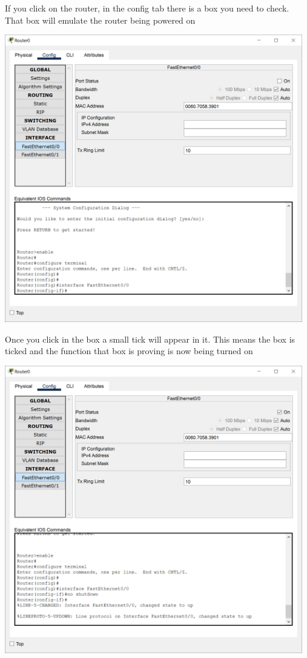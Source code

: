 \documentclass[a4paper,12pt]{article}
\begin{document}
\noindent If you click on the router, in the config tab there is a box you need to check. That box will emulate the router being powered on \newline

\noindent \includegraphics[width=13cm]{./step-by-step/13.PNG}
\clearpage


\noindent Once you click in the box a small tick will appear in it. This means the box is ticked and the function that box is proving is now being turned on \newline

\noindent \includegraphics[width=13cm]{./step-by-step/14.PNG}
\clearpage
\end{document}
